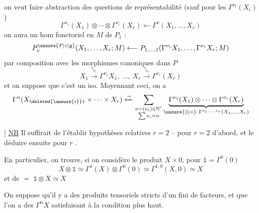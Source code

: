 on veut faire abstraction des questions de
représentabilité (sauf pour les $\Gamma^{\nu_i}(X_i)$)
\[
\Gamma^{\nu_1}(X_1)\otimes\cdots\otimes\Gamma^{\nu_r}(X_r)\longleftarrow\Gamma^\nu(X_1,\ldots,X_r)
\]
on aura un hom fonctoriel en
$M$ ds $P_1$ :
\[
P_{\nu}^{\unsure{P|\circ|\mathfrak{g}}}(X_1,\ldots,X_r;M)\longleftarrow P_{1,\ldots,1}(\Gamma^{\nu_1}X_1,\ldots,\Gamma^{\nu_r}X_r;M)
\]
par composition avec les morphismes canoniques
dans $P$
\[
X_1\xrightarrow{\gamma_{\nu_1}}\Gamma^{\nu_1}X_1,\ \ldots,\ X_r\xrightarrow{\gamma_{\nu_r}}\Gamma^{\nu_r}(X_r)
\]
et on suppose que c'est  un iso.
Moyennant ceci, on a
\[
\Gamma^n(X_{\deleted{\unsure{i}}1}\times\cdots\times X_r)\xleftarrow{\sim}
\sum_{\substack{\nu=(\nu_i)\in\mathbb N^r\\\sum\nu_i=n}}
\underbrace{\Gamma^{\nu_1}(X_1)\otimes\cdots\otimes\Gamma^{\nu_r}(X_r)}_{\unsure{\Vert|=}\ \Gamma^{\nu_1,\ldots,\nu_r}(X_1,\ldots,X_r)}
\]

[ \uline{NB} Il suffirait de l'établir 
hypothèses relatives $r=2$ -- pour $r=2$ d'abord,
et le déduire ensuite pour $r$ .

En particulier, on trouve,  si on
considère le produit $X\times0$, pour $\mathbb{1}=\Gamma^0(0)$
\[
X\otimes\mathbb{1}\simeq\Gamma^1(X)\otimes\Gamma^0(0)\simeq\Gamma^{1,0}(X,0)\simeq X
\]
et de $=$ $\mathbb{1}\otimes X\simeq X$ 

On suppose qu'il y a des produits tensoriels
stricts d'un  fini de facteurs, et que
l'on a des $\Gamma^n X$ satisfaisant à la condition
plus haut.
